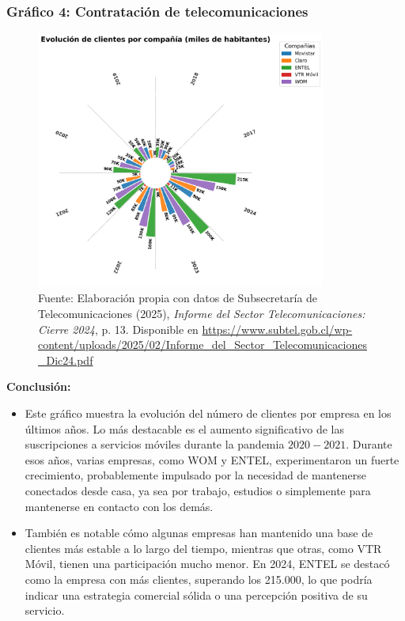 \documentclass[12pt, a4paper]{article}
\begin{document}
\subsubsection*{Gráfico 4: Contratación de telecomunicaciones}
\begin{figure}[H]
    \centering
    \includegraphics[width=0.85\textwidth]{images/graph2_JG.png}
    \caption{
        Fuente: Elaboración propia con datos de Subsecretaría de Telecomunicaciones (2025), 
        \textit{Informe del Sector Telecomunicaciones: Cierre 2024}, p. 13. 
        Disponible en \url{https://www.subtel.gob.cl/wp-content/uploads/2025/02/Informe_del_Sector_Telecomunicaciones_Dic24.pdf}
    }

\end{figure}


\textbf{Conclusión:}  
\begin{itemize}
    \item Este gráfico muestra la evolución del número de clientes por empresa en los últimos años. Lo más destacable es el aumento significativo de las suscripciones a servicios móviles durante la pandemia \(2020-2021\).
    Durante esos años, varias empresas, como WOM y ENTEL, experimentaron un fuerte crecimiento, probablemente impulsado por la necesidad de mantenerse conectados desde casa, ya sea por trabajo, estudios o simplemente para mantenerse en contacto con los demás.
    \item También es notable cómo algunas empresas han mantenido una base de clientes más estable a lo largo del tiempo, mientras que otras, como VTR Móvil, tienen una participación mucho menor. En 2024, ENTEL se destacó como la empresa con más clientes, superando los 215.000, lo que podría indicar una estrategia comercial sólida o una percepción positiva de su servicio.

\end{itemize}
\end{document}

